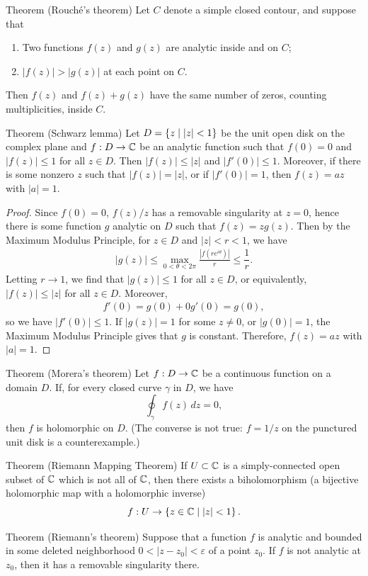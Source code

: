 \begin{thmbox}{Theorem (Rouché's theorem)}
Let $C$ denote a simple closed contour, and suppose that
\begin{enumerate}
    \item[(a)] Two functions $f(z)$ and $g(z)$ are analytic inside and on $C$;
    \item[(b)] $|f(z)| > |g(z)|$ at each point on $C$.
\end{enumerate}
Then $f(z)$ and $f(z)+g(z)$ have the same number of zeros, counting multiplicities, inside $C$.
\end{thmbox}
\begin{thmbox}{Theorem (Schwarz lemma)}
Let $D = \left\{ z \mid |z| < 1\right\}$ be the unit open disk on the complex plane and $f: D \to \mathbb{C}$ be an analytic function such that $f(0) = 0$ and $|f(z)| \le 1$ for all $z \in D$. Then $|f(z)| \le |z|$ and $|f'(0)| \le 1$. Moreover, if there is some nonzero $z$ such that $|f(z)| = |z|$, or if $|f'(0)| = 1$, then $f(z) = az$ with $|a|=1$.
\end{thmbox}
\begin{proof}
Since $f(0) = 0$, $f(z)/z$ has a removable singularity at $z = 0$, hence there is some function $g$ analytic on $D$ such that $f(z) = z g(z)$. Then by the Maximum Modulus Principle, for $z \in D$ and $|z| < r < 1$, we have
\begin{align*}
    |g(z)| \le \max_{0 < \theta < 2\pi} \frac{|f(re^{i\theta})|}{r} \le \dfrac{1}{r}.
\end{align*}
Letting $r \to 1$, we find that $|g(z)| \le 1$ for all $z \in D$, or equivalently, $|f(z)| \le |z|$ for all $z \in D$. Moreover,
\begin{align*}
    f'(0) = g(0) + 0 g'(0) = g(0),
\end{align*}
so we have $|f'(0)| \le 1$. If $|g(z)| = 1$ for some $z \ne 0$, or $|g(0)| = 1$, the Maximum Modulus Principle gives that $g$ is constant. Therefore, $f(z) = a z$ with $|a|=1$.
\end{proof}
\begin{thmbox}{Theorem (Morera's theorem)}
Let $f: D \to \mathbb{C}$ be a continuous function on a domain $D$. If, for every closed curve $\gamma$ in $D$, we have
$$ \oint_\gamma f(z) \,dz = 0, $$
then $f$ is holomorphic on $D$. (The converse is not true: $f = 1/z$ on the punctured unit disk is a counterexample.)
\end{thmbox}
\begin{thmbox}{Theorem (Riemann Mapping Theorem)}
If $U \subset \mathbb{C}$ is a simply-connected open subset of $\mathbb{C}$ which is not all of $\mathbb{C}$, then there exists a biholomorphism (a bijective holomorphic map with a holomorphic inverse)
$$ f: U \to \left\{ z \in \mathbb{C} \mid |z| < 1\right\}. $$
\end{thmbox}
\begin{thmbox}{Theorem (Riemann's theorem)}
Suppose that a function $f$ is analytic and bounded in some deleted neighborhood $0 < |z - z_0| < \varepsilon$ of a point $z_0$. If $f$ is not analytic at $z_0$, then it has
a removable singularity there.
\end{thmbox}
